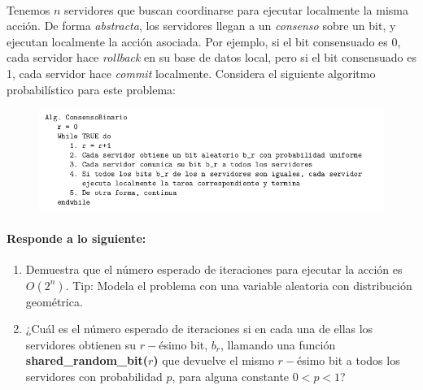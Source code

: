 \documentclass[12pt]{article}
\begin{document}
\paragraph{} Tenemos $n$ servidores que buscan coordinarse para ejecutar localmente la misma acción. De forma \textit{abstracta}, los servidores llegan a un \textit{consenso} sobre un bit, y ejecutan localmente la acción asociada. Por ejemplo, si el bit consensuado es 0, cada servidor hace \textit{rollback} en su base de datos local, pero si el bit consensuado es 1, cada servidor hace \textit{commit} localmente. Considera el siguiente algoritmo probabilístico para este problema:
\begin{figure}[h]
	\begin{center}
		\includegraphics[width=\textwidth]{AlgoProba}
	\end{center}
\end{figure}
\paragraph{Responde a lo siguiente:}
\begin{enumerate}
	\item Demuestra que el número esperado de iteraciones para ejecutar la acción es $O(2^n)$. Tip: Modela el problema con una variable aleatoria con distribución geométrica.
	\item ¿Cuál es el número esperado de iteraciones si en cada una de ellas los servidores obtienen su $r-$ésimo bit, $b_r$, llamando una función \textbf{shared\_random\_bit($r$)} que devuelve el mismo $r-$ésimo bit a todos los servidores con probabilidad $p$, para alguna constante $0 < p < 1$?
\end{enumerate}
\end{document}
